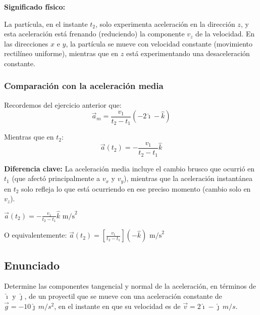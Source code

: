 \documentclass[12pt, a4paper]{article}
\begin{document}
\textbf{Significado físico:}

La partícula, en el instante $t_2$, solo experimenta aceleración en la dirección $z$, y esta aceleración está frenando (reduciendo) la componente $v_z$ de la velocidad. En las direcciones $x$ e $y$, la partícula se mueve con velocidad constante (movimiento rectilíneo uniforme), mientras que en $z$ está experimentando una desaceleración constante.

\subsubsection*{Comparación con la aceleración media}

Recordemos del ejercicio anterior que:
\begin{equation}
\vec{a}_m = \frac{v_1}{t_2 - t_1}(-2\hat{\imath} - \hat{k})
\end{equation}

Mientras que en $t_2$:
\begin{equation}
\vec{a}(t_2) = -\frac{v_1}{t_2 - t_1}\hat{k}
\end{equation}

\textbf{Diferencia clave:} La aceleración media incluye el cambio brusco que ocurrió en $t_1$ (que afectó principalmente a $v_x$ y $v_y$), mientras que la aceleración instantánea en $t_2$ solo refleja lo que está ocurriendo en ese preciso momento (cambio solo en $v_z$).

\begin{tcolorbox}[colback=blue!5!white, colframe=blue!75!black, title=Respuesta Final]
\centering
\Large $\boxed{\vec{a}(t_2) = -\frac{v_1}{t_2 - t_1}\hat{k} \text{ m/s}^2}$

\vspace{0.3cm}
\normalsize
O equivalentemente: $\boxed{\vec{a}(t_2) = \left[\frac{v_1}{t_2 - t_1}\right](-\hat{k}) \text{ m/s}^2}$
\end{tcolorbox}

\newpage

\subsection*{Enunciado}
Determine las componentes tangencial y normal de la aceleración, en términos de $\hat{\imath}$ y $\hat{\jmath}$, de un proyectil que se mueve con una aceleración constante de $\vec{g} = -10\hat{\jmath} \, \si{m/s^2}$, en el instante en que su velocidad es de $\vec{v} = 2\hat{\imath} - \hat{\jmath} \, \si{m/s}$.
\end{document}
